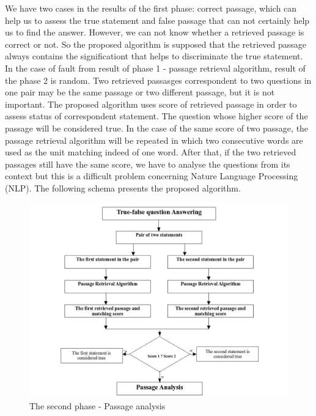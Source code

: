 \documentclass[12pt, a4paper]{report}
\begin{document}
We have two cases in the results of the first phase: correct passage, which can help us to assess the true statement and false passage that can not certainly help us to find the answer. However, we can not know whether a retrieved passage is correct or not. So the proposed algorithm is supposed that the retrieved passage always contains the significationt that helps to discriminate the true statement. In the case of fault from result of phase 1 - passage retrieval algorithm, result of the phase 2 is random. Two retrieved passasges correspondent to two questions in one pair may be the same passage or two different passage, but it is not important. The proposed algorithm uses score of retrieved passage in order to assess status of correspondent statement. The question whose higher score of the passage will be considered true. In the case of the same score of two passage, the passage retrieval algorithm will be repeated in which two consecutive words are used as the unit matching indeed of one word. After that, if the two retrieved passages still have the same score, we have to analyse the questions from its context but this is a difficult problem concerning Nature Language Processing (NLP). The following schema presents the proposed algorithm.

\begin{figure}[htbp]
\centering
\includegraphics[height=9.5 cm]{schema2.jpg}
\caption{The second phase - Passage analysis}\label{fig5}
\end{figure}
\newpage


\end{document}
